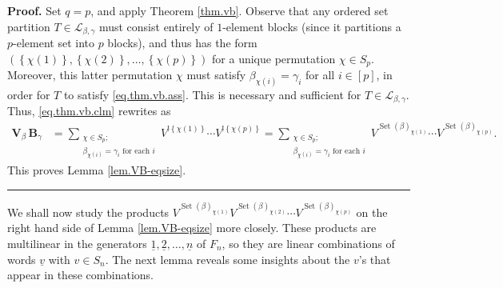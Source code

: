 \documentclass[submission]{FPSAC2026}
\newcommand{\kk}{\mathbf{k}} %
\newcommand{\Set}{\operatorname{Set}}
\newcommand{\set}[1]{\left\{ #1 \right\}}
\newcommand{\tup}[1]{\left( #1 \right)}
\newenvironment{proof}[1][Proof]{\noindent\textbf{#1.} }{\ \rule{0.5em}{0.5em}}
\begin{document}
\begin{proof}
Set $q = p$, and apply Theorem \ref{thm.vb}.
Observe that any ordered set partition $T \in \mathcal{L}_{\beta, \gamma}$
must consist entirely of $1$-element blocks (since it partitions a
$p$-element set into $p$ blocks), and thus has the form
$\tup{\set{\chi\tup{1}}, \set{\chi\tup{2}}, \ldots,
\set{\chi\tup{p}}}$ for a unique permutation $\chi \in S_p$.
Moreover, this latter permutation $\chi$ must satisfy
$\beta_{\chi\tup{i}} = \gamma_i$ for all $i \in [p]$,
in order for $T$ to satisfy \eqref{eq.thm.vb.ass}.
This is necessary and sufficient for $T \in \mathcal{L}_{\beta, \gamma}$.
Thus, \eqref{eq.thm.vb.clm} rewrites as
\begin{align*}
\mathbf{V}_{\beta}\,\mathbf{B}_{\gamma}  & =\sum_{\substack{\chi\in
S_{p};\\\beta_{\chi\left(  i\right)  }=\gamma_{i}\text{ for each }%
i}}V^{!\left\{  \chi\left(  1\right)  \right\}  }\cdots V^{!\left\{  \chi\left(
p\right)  \right\}  }
=\sum_{\substack{\chi\in S_{p};\\\beta_{\chi\left(  i\right)  }=\gamma
_{i}\text{ for each }i}}V^{\Set(\beta)_{\chi(1)}}\cdots
V^{\Set(\beta)_{\chi(p)}}.
\end{align*}
This proves Lemma \ref{lem.VB-eqsize}.
\end{proof}

We shall now study the products
$V^{\Set(\beta)_{\chi(1)}} V^{\Set(\beta)_{\chi(2)}} \cdots
V^{\Set(\beta)_{\chi(p)}}$
on the right hand side of Lemma \ref{lem.VB-eqsize} more closely.
These products are multilinear in the generators
$\underline 1,\underline 2,\ldots,\underline n$ of $F_n$,
so they
are linear combinations of words
$\underline v$ with $v \in S_n$.
The next lemma reveals some insights about the $v$'s that
appear in these combinations.
\end{document}
